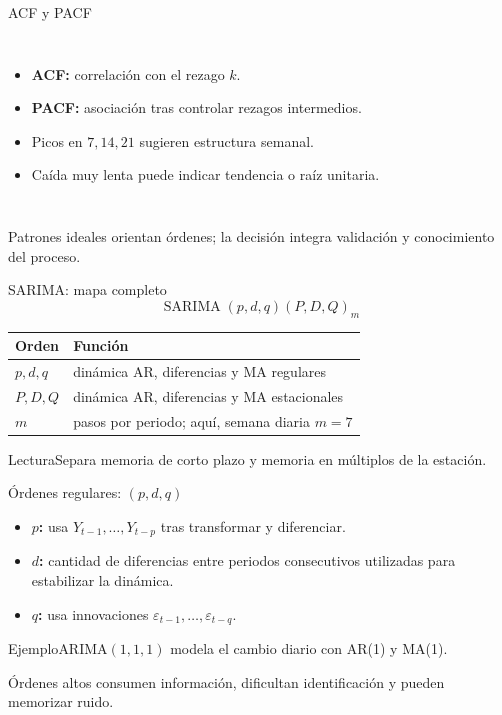\documentclass[aspectratio=169,10pt]{beamer}
\newcommand{\concepto}[1]{\textcolor{UAPTeal}{\textbf{#1}}}
\begin{document}
\begin{frame}{ACF y PACF}\small
\begin{columns}[T]\begin{itemize}\item \concepto{ACF:} correlación con el rezago $k$.\item \concepto{PACF:} asociación tras controlar rezagos intermedios.\item Picos en $7,14,21$ sugieren estructura semanal.\item Caída muy lenta puede indicar tendencia o raíz unitaria.\end{itemize}\centering
{}\end{columns}
Patrones ideales orientan órdenes; la decisión integra validación y conocimiento del proceso.
\end{frame}

\begin{frame}{SARIMA: mapa completo}\small
\[\operatorname{SARIMA}(p,d,q)(P,D,Q)_m\]
\begin{tabularx}{\textwidth}{>{\bfseries}p{}X}\toprule Orden & Función\\\midrule $p,d,q$ & dinámica AR, diferencias y MA regulares\\ $P,D,Q$ & dinámica AR, diferencias y MA estacionales\\ $m$ & pasos por periodo; aquí, semana diaria $m=7$\\\bottomrule\end{tabularx}
\begin{block}{Lectura}Separa memoria de corto plazo y memoria en múltiplos de la estación.\end{block}
\end{frame}

\begin{frame}{Órdenes regulares: $(p,d,q)$}\small
\begin{itemize}\item \concepto{$p$:} usa $Y_{t-1},\ldots,Y_{t-p}$ tras transformar y diferenciar.\item \concepto{$d$:} cantidad de diferencias entre periodos consecutivos utilizadas para estabilizar la dinámica.\item \concepto{$q$:} usa innovaciones $\varepsilon_{t-1},\ldots,\varepsilon_{t-q}$.\end{itemize}
\begin{block}{Ejemplo}ARIMA$(1,1,1)$ modela el cambio diario con AR(1) y MA(1).\end{block}
Órdenes altos consumen información, dificultan identificación y pueden memorizar ruido.
\end{frame}
\end{document}
